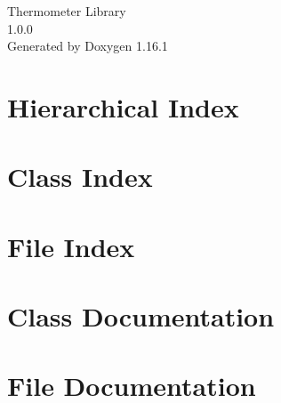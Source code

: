 \documentclass[twoside]{book}
\newcommand{\+}{\discretionary{\mbox{\scriptsize$\hookleftarrow$}}{}{}}
\newcommand{\clearemptydoublepage}{%
    \newpage{\pagestyle{empty}\cleardoublepage}%
  }
\begin{document}
  \raggedbottom
    \hypersetup{pageanchor=false,
                bookmarksnumbered=true,
                pdfencoding=unicode
               }
  \begin{titlepage}
  \vspace*{7cm}
  \begin{center}%
  {\Large Thermometer Library}\\
  [1ex]\large 1.\+0.\+0 \\
  \vspace*{1cm}
  {\large Generated by Doxygen 1.16.1}\\
  \end{center}
  \end{titlepage}
  \clearemptydoublepage
  \tableofcontents
  \clearemptydoublepage
  \hypersetup{pageanchor=true}

\chapter{Hierarchical Index}

\chapter{Class Index}

\chapter{File Index}

\chapter{Class Documentation}




\chapter{File Documentation}








  \backmatter
  \newpage
  \clearemptydoublepage
  \printindex
\end{document}
